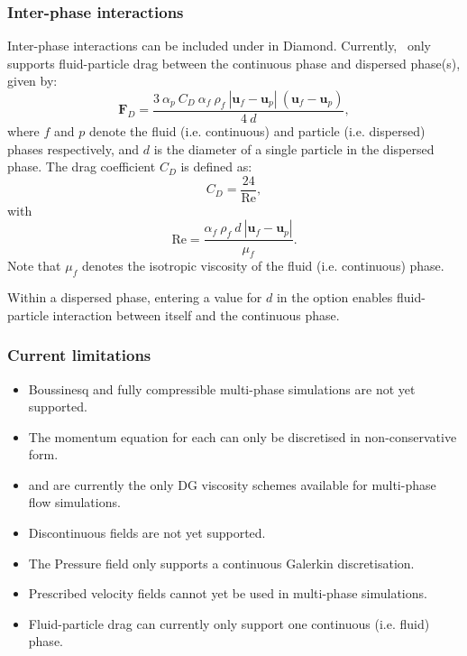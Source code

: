 \subsubsection{Inter-phase interactions}
Inter-phase interactions can be included under  in Diamond. Currently, \fluidity\ only supports fluid-particle drag between the continuous phase and dispersed phase(s), given by:
\begin{equation}\label{eq:multiphase_drag_term}
\mathbf{F}_D = \frac{3\ \alpha_p\ C_D\ \alpha_f\ \rho_f\ |\mathbf{u}_f-\mathbf{u}_p|\ (\mathbf{u}_f-\mathbf{u}_p)}{4\ d},
\end{equation}
where $f$ and $p$ denote the fluid (i.e. continuous) and particle (i.e. dispersed) phases respectively, and $d$ is the diameter of a single particle in the dispersed phase. The drag coefficient $C_D$ is defined as:
\begin{equation}\label{eq:drag_coefficient}
C_D = \frac{24}{\mathrm{Re}},
\end{equation}
with
\begin{equation}\label{eq:particle_reynolds_number}
\mathrm{Re} = \frac{\alpha_f\ \rho_f\ d\ |\mathbf{u}_f-\mathbf{u}_p|}{\mu_f}.
\end{equation}
Note that $\mu_f$ denotes the isotropic viscosity of the fluid (i.e. continuous) phase.

Within a dispersed phase, entering a value for $d$ in the  option enables fluid-particle interaction between itself and the continuous phase.

\subsubsection{Current limitations}
\begin{itemize}
 \item Boussinesq and fully compressible multi-phase simulations are not yet supported.
 \item The momentum equation for each  can only be discretised in non-conservative form.
 \item {} and  are currently the only DG viscosity schemes available for multi-phase flow simulations.
 \item Discontinuous  fields are not yet supported.
 \item The Pressure field only supports a continuous Galerkin discretisation.
 \item Prescribed velocity fields cannot yet be used in multi-phase simulations.
 \item Fluid-particle drag can currently only support one continuous (i.e. fluid) phase.
\end{itemize}


